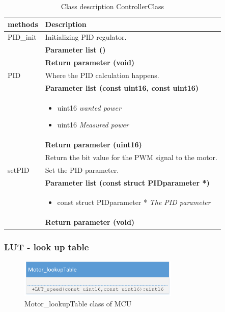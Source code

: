 \begin{table}[H]
	\centering
	\begin{tabular}{|p{5 cm}|p{10 cm}|}
		\hline
		\textbf{methods} & \textbf{Description} \\ \hline
		
		PID\_init
		& Initializing PID regulator.
		\\ & \textbf{Parameter list ()}
		\\ & \textbf{Return parameter (void)}
		\\ \hline
		
		PID
		& Where the PID calculation happens.
		\\ & \textbf{Parameter list (const uint16, const uint16)}
		\\ & \begin{itemize}
			\item {\large uint16}
			\subitem \textit{wanted power}
			\item {\large uint16}
			\subitem \textit{Measured power}
		\end{itemize}
		\\ & \textbf{Return parameter (uint16)}
		\\ & Return the bit value for the PWM signal to the motor.
		\\ \hline
		
		setPID
		& Set the PID parameter.
		\\ & \textbf{Parameter list (const struct PIDparameter *)}
		\\ & \begin{itemize}
			\item {\large const struct PIDparameter *}
			\subitem \textit{The PID parameter}
		\end{itemize}
		\\ & \textbf{Return parameter (void)}
		\\ \hline
		
	\end{tabular}
	\caption{Class description ControllerClass}
	\label{table:Class_description_MCU_PID}
\end{table}

\subsubsection{LUT - look up table}

\begin{figure}[H]
	\centering
	\includegraphics [width=3in]{Software/Pictures/class-diagram-LUT.png}
	\caption{Motor\_lookupTable class of MCU}
	\label{fig:Class_diagram_MCU_LUT}
\end{figure}

